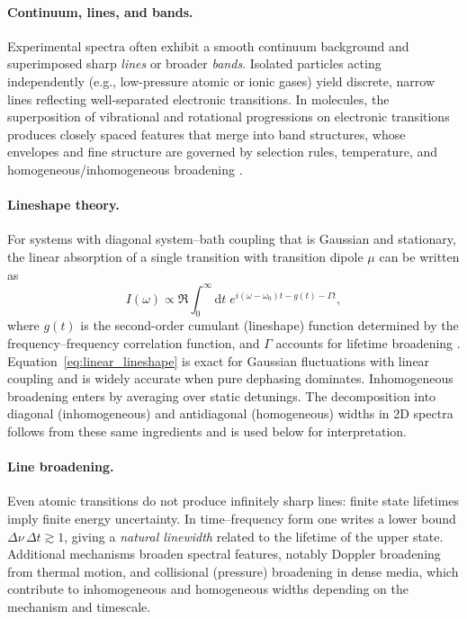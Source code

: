 \paragraph{Continuum, lines, and bands.}
Experimental spectra often exhibit a smooth continuum background and superimposed sharp \emph{lines} or broader \emph{bands}. Isolated particles acting independently (e.g., low-pressure atomic or ionic gases) yield discrete, narrow lines reflecting well-separated electronic transitions. In molecules, the superposition of vibrational and rotational progressions on electronic transitions produces closely spaced features that merge into band structures, whose envelopes and fine structure are governed by selection rules, temperature, and homogeneous/inhomogeneous broadening \cite{skoogetal2017principlesinstrumentalanalysis}.

\paragraph{Lineshape theory.}
For systems with diagonal system--bath coupling that is Gaussian and stationary, the linear absorption of a single transition with transition dipole $\mu$ can be written as
\begin{equation}
    I(\omega)\propto \Re\int_0^\infty \mathrm{d}t\; e^{i(\omega-\omega_0)t-g(t)-\Gamma t},
    \label{final:eq:linear_lineshape}
\end{equation}
where $g(t)$ is the second-order cumulant (lineshape) function determined by the frequency--frequency correlation function, and $\Gamma$ accounts for lifetime broadening \cite{mukamel1995principlesnonlinearoptical, hamm2005principlesnonlinearoptical}. Equation~\eqref{eq:linear_lineshape} is exact for Gaussian fluctuations with linear coupling and is widely accurate when pure dephasing dominates. Inhomogeneous broadening enters by averaging over static detunings. The decomposition into diagonal (inhomogeneous) and antidiagonal (homogeneous) widths in 2D spectra follows from these same ingredients and is used below for interpretation.

\paragraph{Line broadening.}
Even atomic transitions do not produce infinitely sharp lines: finite state lifetimes imply finite energy uncertainty. In time--frequency form one writes a lower bound $\Delta \nu\,\Delta t \gtrsim 1$, giving a \emph{natural linewidth} related to the lifetime of the upper state. Additional mechanisms broaden spectral features, notably Doppler broadening from thermal motion, and collisional (pressure) broadening in dense media, which contribute to inhomogeneous and homogeneous widths depending on the mechanism and timescale.

